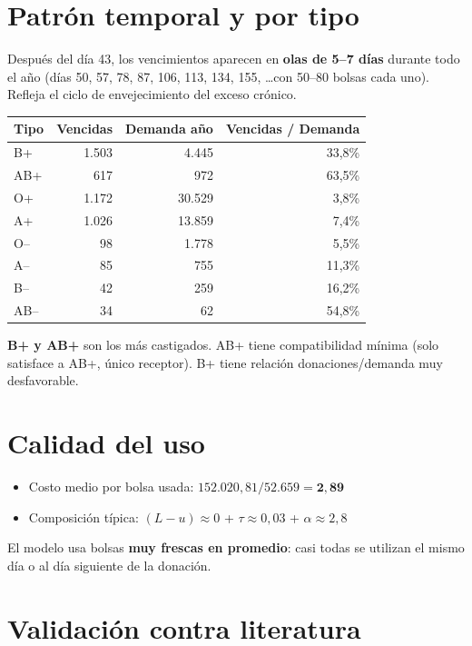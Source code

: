 \documentclass[11pt, a4paper]{article}
\begin{document}
\section{Patrón temporal y por tipo}

Después del día 43, los vencimientos aparecen en \textbf{olas de 5--7 días} durante todo el año (días 50, 57, 78, 87, 106, 113, 134, 155, \ldots con 50--80 bolsas cada uno). Refleja el ciclo de envejecimiento del exceso crónico.

\begin{center}
\begin{tabular}{lrrr}
\toprule
\rowcolor{rowgray}\textbf{Tipo} & \textbf{Vencidas} & \textbf{Demanda año} & \textbf{Vencidas / Demanda}\\
\midrule
B+ & 1.503 & 4.445 & 33,8\% \\
AB+ & 617 & 972 & 63,5\% \\
O+ & 1.172 & 30.529 & 3,8\% \\
A+ & 1.026 & 13.859 & 7,4\% \\
O-- & 98 & 1.778 & 5,5\% \\
A-- & 85 & 755 & 11,3\% \\
B-- & 42 & 259 & 16,2\% \\
AB-- & 34 & 62 & 54,8\% \\
\bottomrule
\end{tabular}
\end{center}

\textbf{B+ y AB+} son los más castigados. AB+ tiene compatibilidad mínima (solo satisface a AB+, único receptor). B+ tiene relación donaciones/demanda muy desfavorable.

\section{Calidad del uso}

\begin{itemize}[leftmargin=*, itemsep=2pt]
  \item Costo medio por bolsa usada: $152.020,81 / 52.659 = \mathbf{2{,}89}$
  \item Composición típica: $(L-u)\approx 0$ + $\tau \approx 0{,}03$ + $\alpha \approx 2{,}8$
\end{itemize}

El modelo usa bolsas \textbf{muy frescas en promedio}: casi todas se utilizan el mismo día o al día siguiente de la donación.

\section{Validación contra literatura}
\end{document}
